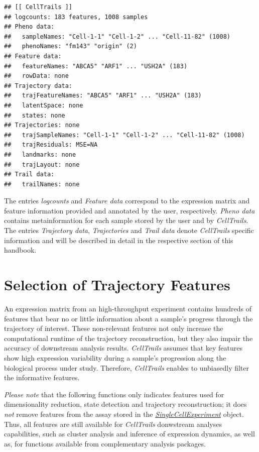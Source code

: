 \documentclass[]{book}
\theoremstyle{definition}
\theoremstyle{definition}
\theoremstyle{definition}
\theoremstyle{remark}
\begin{document}
\begin{verbatim}
## [[ CellTrails ]] 
## logcounts: 183 features, 1008 samples
## Pheno data: 
##   sampleNames: "Cell-1-1" "Cell-1-2" ... "Cell-11-82" (1008)
##   phenoNames: "fm143" "origin" (2)
## Feature data: 
##   featureNames: "ABCA5" "ARF1" ... "USH2A" (183)
##   rowData: none
## Trajectory data: 
##   trajFeatureNames: "ABCA5" "ARF1" ... "USH2A" (183)
##   latentSpace: none
##   states: none
## Trajectories: none
##   trajSampleNames: "Cell-1-1" "Cell-1-2" ... "Cell-11-82" (1008)
##   trajResiduals: MSE=NA
##   landmarks: none
##   trajLayout: none
## Trail data: 
##   trailNames: none
\end{verbatim}

The entries \emph{logcounts} and \emph{Feature data} correspond to the
expression matrix and feature information provided and annotated by the
user, respectively. \emph{Pheno data} contains metainformation for each
sample stored by the user and by \emph{CellTrails}. The entries
\emph{Trajectory data}, \emph{Trajectories} and \emph{Trail data} denote
\emph{CellTrails} specific information and will be described in detail
in the respective section of this handbook.

\chapter{Selection of Trajectory
Features}\label{selection-of-trajectory-features}

An expression matrix from an high-throughput experiment contains
hundreds of features that bear no or little information about a sample's
progress through the trajectory of interest. These non-relevant features
not only increase the computational runtime of the trajectory
reconstruction, but they also impair the accuracy of downstream analysis
results. \emph{CellTrails} assumes that key features show high
expression variability during a sample's progression along the
biological process under study. Therefore, \emph{CellTrails} enables to
unbiasedly filter the informative features.

\emph{Please note} that the following functions only indicates features
used for dimensionality reduction, state detection and trajectory
reconstruction; it does \emph{not} remove features from the assay stored
in the
\emph{\href{http://bioconductor.org/packages/SingleCellExperiment}{SingleCellExperiment}}
object. Thus, all features are still available for \emph{CellTrails}
donwstream analyses capabilities, such as cluster analysis and inference
of expression dynamics, as well as, for functions available from
complementary analysis packages.
\end{document}
